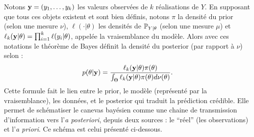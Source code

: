 Notons $\mathbf{y} = (y_1,\dots,y_k)$ les valeurs observées de $k$ réalisations de $Y$. En supposant que tous ces objets existent et sont bien définis, notons $\pi$ la densité du prior (selon une mesure $\nu$), $\ell(\cdot|\theta)$ les densités de $\mathbb{P}_{Y|\theta}$ (selon une mesure $\mu$) et  $\ell_k(\mathbf{y}|\theta)=\prod_{i=1}^k\ell(y_i|\theta)$, appelée la vraisemblance du modèle. Alors avec ces notations le théorème de Bayes définit la densité du posterior (par rapport à $\nu$) selon :
    \begin{equation}
        p(\theta|\mathbf{y}) = \frac{\ell_k(\mathbf{y}|\theta)\pi(\theta)}{\int_{\Theta}\ell_k(\mathbf{y}|\theta)\pi(\theta)d\nu(\theta)  }.
    \end{equation}
Cette formule fait le lien entre le prior, le modèle (représenté par la vraisemblance), les données, et le posterior qui traduit la prédiction crédible. Elle permet de schématiser le canevas bayésien comme une chaine de transmission d'information vers l'\emph{a posteriori}, depuis deux sources : le ``réel'' (les observations) et l'\emph{a priori}. Ce schéma est celui présenté ci-dessous.
    \begin{figure}[h]
        \centering
    \end{figure}

